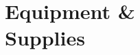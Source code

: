 \documentclass[letterpaper, 11pt]{article}
\newcommand{\due}[1]{\href{https://github.com/ucdart/UCD-EEC134/blob/master/support/schedule/eec134-schedule.pdf}{\textcolor{red}{#1}}}
\begin{document}
\vspace{3ex}

%
%

\newpage
\section{Equipment \& \\Supplies}
\end{document}
